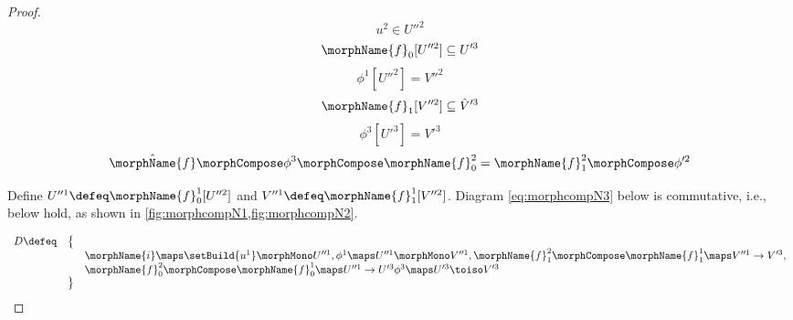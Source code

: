 \documentclass{article}
\begin{document}
\begin{lemma}
\begin{enumerate}
\begin{proof}
\begin{equation}
u^2 \in U''^2
\label{eq:xin2}
\end{equation}
\begin{equation}
\morphName{f}_0[U''^2] \subseteq U'^3
\end{equation}
\begin{equation}
\phi^1[U''^2] = V''^2
\end{equation}
\begin{equation}
\morphName{f}_1[V''^2] \subseteq \hat{V}'^3
\label{eq:fvp1in2}
\end{equation}
\begin{equation}
\phi^3[U'^3] = V'^3
\end{equation}
\begin{equation}
\hat{\morphName{f}} \morphCompose \phi^3 \morphCompose \morphName{f}^2_0 =
\morphName{f}^2_1 \morphCompose \phi'^2
\label{eq:fphigeqgphi2}
\end{equation}

Define $U''^1 \defeq \morphName{f}^1_0[U''^2]$ and
$V''^1 \defeq \morphName{f}^1_1[V''^2]$. Diagram \eqref{eq:morphcompN3}
below is commutative, i.e.,
{
  \showlabelsinline
}
below hold, as shown in \cref{fig:morphcompN1,fig:morphcompN2}.

\begin{equation}
\label{eq:morphcompN3}
\begin{array} {lll}
D \defeq & \bigl \{
\\
  &&
  \morphName{i} \maps \setBuild{u^1} \morphMono U''^1,
  \phi^1 \maps U''^1 \morphMono V''^1,
  \morphName{f}^2_1 \morphCompose \morphName{f}^1_1 \maps  V''^1 \to V'^3,
\\
  &&
  \morphName{f}^2_0 \morphCompose \morphName{f}^1_0 \maps U''^1 \to U'^3
  \phi^3 \maps U'^3 \toiso V'^3
\\
& \bigr \}
\end{array}
\end{equation}


\end{proof}
\end{enumerate}
\end{lemma}
\end{document}
